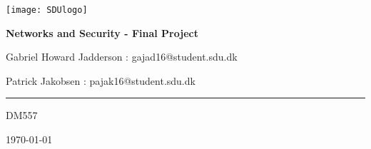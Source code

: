 \begin{titlepage}
	\centering
	\texttt{[image: SDUlogo]}\par\vspace{0.5cm} %
	{\huge\bfseries Networks and Security - Final Project\par}
	\vspace{0.5cm}
	{\small Gabriel Howard Jadderson : gajad16@student.sdu.dk\par}
	{\small Patrick Jakobsen : pajak16@student.sdu.dk\par}
  {\rule{10.0cm}{0.1mm}\par}
	{\small DM557\par}
	{\small \today\par}
	\vspace{1cm}
\end{titlepage}

